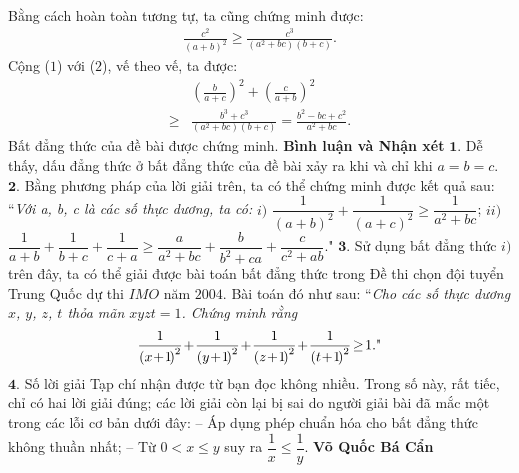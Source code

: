 \begin{multicols}{2}
\begin{align*}
	\end{align*}
	Bằng cách hoàn toàn tương tự, ta cũng chứng minh được:
	\begin{align*}
		\frac{{{c^2}}}{{{{\left( {a + b} \right)}^2}}} \ge \frac{{{c^3}}}{{\left( {{a^2} + bc} \right)\left( {b + c} \right)}}. \tag{$2$}
	\end{align*}
	Cộng ($1$) với ($2$), vế theo vế, ta được:
	\begin{align*}
		&{\left( {\frac{b}{{a + c}}} \right)^2} + {\left( {\frac{c}{{a + b}}} \right)^2} \\
		\ge &\frac{{{b^3} + {c^3}}}{{\left( {{a^2} + bc} \right)\left( {b + c} \right)}} = \frac{{{b^2} - bc + {c^2}}}{{{a^2} + bc}}.
	\end{align*}
	Bất đẳng thức của đề bài được chứng minh.
	\vskip 0.05cm
	\textbf{\color{thachthuctoanhoc}Bình luận và Nhận xét}
	\vskip 0.05cm
	$\pmb{1.}$ Dễ thấy, dấu đẳng thức ở bất đẳng thức của đề bài xảy ra khi và chỉ khi $a = b = c$.
	\vskip 0.05cm
	$\pmb{2.}$ Bằng phương pháp của lời giải trên, ta có thể chứng minh được kết quả sau:
	\vskip 0.05cm
	``\textit{Với a, b, c là các số thực dương, ta có:}
	\vskip 0.05cm
	$i)$  $\dfrac{1}{{{{\left( {a + b} \right)}^2}}} + \dfrac{1}{{{{\left( {a + c} \right)}^2}}} \ge \dfrac{1}{{{a^2} + bc}}$;
	\vskip 0.05cm
	$ii)$  $\dfrac{1}{{a + b}} + \dfrac{1}{{b + c}} + \dfrac{1}{{c + a}} \ge \dfrac{a}{{{a^2} + bc}} + \dfrac{b}{{{b^2} + ca}} + \dfrac{c}{{{c^2} + ab}}.$"
	\vskip 0.05cm
	$\pmb{3.}$ Sử dụng bất đẳng thức $i)$ trên đây, ta có thể giải được bài toán bất đẳng thức trong Đề thi chọn đội tuyển Trung Quốc dự thi $IMO$ năm $2004$. Bài toán đó như sau:
	\vskip 0.05cm
	``\textit{Cho các số thực dương $x$, $y$, $z$, $t$ thỏa mãn $xyzt = 1$. Chứng minh rằng}
	\begin{align*}
		\frac{1}{{{{\left( {x \!+\! 1} \!\right)}^2}}} \!+\! \frac{1}{{{{\left( {y \!+\! 1} \!\right)}^2}}} \!+\! \frac{1}{{{{\left( {z \!+\! 1}\! \right)}^2}}} \!+\! \frac{1}{{{{\left( {t \!+\! 1}\! \right)}^2}}} \!\ge\! 1. \text{\color{black}"}
	\end{align*}
	$\pmb{4.}$ Số lời giải Tạp chí nhận được từ bạn đọc không nhiều. Trong số này, rất tiếc, chỉ có hai lời giải đúng; các lời giải còn lại bị sai do người giải bài đã mắc một trong các lỗi cơ bản dưới đây:
	\vskip 0.05cm
	-- Áp dụng phép chuẩn hóa cho bất đẳng thức không thuần nhất;
	\vskip 0.05cm
	-- Từ $0 < x \le y$ suy ra  $\dfrac{1}{x} \le \dfrac{1}{y}$.
	\vskip 0.05cm 
	\hfill \textbf{\color{thachthuctoanhoc}Võ Quốc Bá Cẩn}
	\vskip 0.05cm
	{}

\end{multicols}

